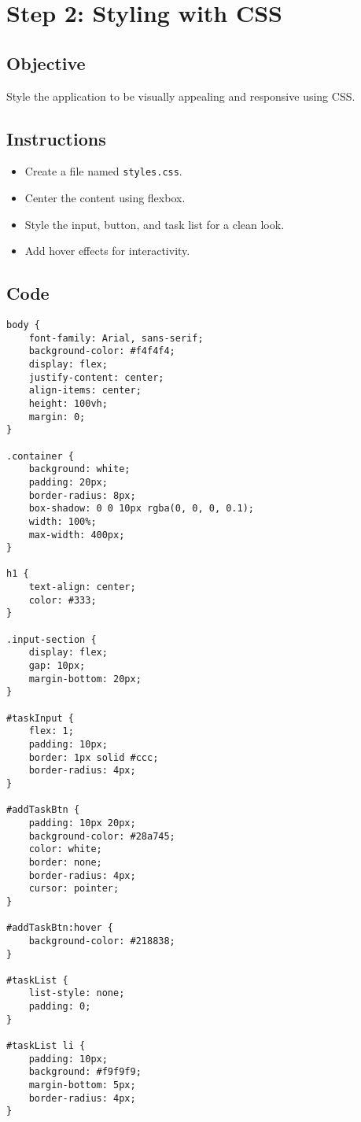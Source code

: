 \documentclass[a4paper,12pt]{article}
\begin{document}
\section{Step 2: Styling with CSS}
\subsection{Objective}
Style the application to be visually appealing and responsive using CSS.

\subsection{Instructions}
\begin{itemize}
    \item Create a file named \texttt{styles.css}.
    \item Center the content using flexbox.
    \item Style the input, button, and task list for a clean look.
    \item Add hover effects for interactivity.
\end{itemize}

\subsection{Code}
\lstset{language=CSS}
\begin{lstlisting}
body {
    font-family: Arial, sans-serif;
    background-color: #f4f4f4;
    display: flex;
    justify-content: center;
    align-items: center;
    height: 100vh;
    margin: 0;
}

.container {
    background: white;
    padding: 20px;
    border-radius: 8px;
    box-shadow: 0 0 10px rgba(0, 0, 0, 0.1);
    width: 100%;
    max-width: 400px;
}

h1 {
    text-align: center;
    color: #333;
}

.input-section {
    display: flex;
    gap: 10px;
    margin-bottom: 20px;
}

#taskInput {
    flex: 1;
    padding: 10px;
    border: 1px solid #ccc;
    border-radius: 4px;
}

#addTaskBtn {
    padding: 10px 20px;
    background-color: #28a745;
    color: white;
    border: none;
    border-radius: 4px;
    cursor: pointer;
}

#addTaskBtn:hover {
    background-color: #218838;
}

#taskList {
    list-style: none;
    padding: 0;
}

#taskList li {
    padding: 10px;
    background: #f9f9f9;
    margin-bottom: 5px;
    border-radius: 4px;
}
\end{lstlisting}
\end{document}

